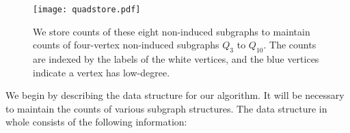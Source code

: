 \documentclass[11pt]{article}
\begin{document}
\begin{figure}[!b]
\vspace{-20pt}
\begin{center}
\texttt{[image: quadstore.pdf]}
\end{center}
\vspace{-24pt}
\caption{We store counts of these eight non-induced subgraphs to maintain counts of
four-vertex non-induced subgraphs $Q_3$ to $Q_{10}$. The counts are indexed by the
labels of the white vertices, and the blue vertices indicate a vertex 
has low-degree.}
\label{fig-quadstore}
\end{figure}

We begin by describing the data structure for our algorithm.  It will be necessary to maintain the counts of various subgraph structures.  The data structure in whole consists of the following information:
\end{document}
